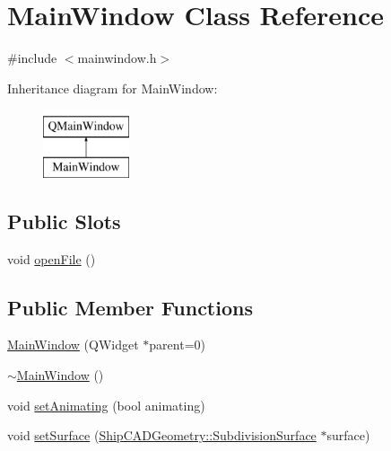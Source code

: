 \hypertarget{classMainWindow}{\section{Main\-Window Class Reference}
\label{classMainWindow}
}


{\ttfamily \#include $<$mainwindow.\-h$>$}

Inheritance diagram for Main\-Window\-:\begin{figure}[H]
\begin{center}
\leavevmode
\includegraphics[height=2.000000cm]{classMainWindow}
\end{center}
\end{figure}
\subsection*{Public Slots}
\begin{DoxyCompactItemize}
\item 
void \hyperlink{classMainWindow_a288b768c3c21a9171bdc56fe845ece8b}{open\-File} ()
\end{DoxyCompactItemize}
\subsection*{Public Member Functions}
\begin{DoxyCompactItemize}
\item 
\hyperlink{classMainWindow_a8b244be8b7b7db1b08de2a2acb9409db}{Main\-Window} (Q\-Widget $\ast$parent=0)
\item 
\hyperlink{classMainWindow_ae98d00a93bc118200eeef9f9bba1dba7}{$\sim$\-Main\-Window} ()
\item 
void \hyperlink{classMainWindow_ae53d70703200d86162a68a9a8ba593ee}{set\-Animating} (bool animating)
\item 
void \hyperlink{classMainWindow_a46174915909fa9012d8cb99e37a85fbc}{set\-Surface} (\hyperlink{classShipCADGeometry_1_1SubdivisionSurface}{Ship\-C\-A\-D\-Geometry\-::\-Subdivision\-Surface} $\ast$surface)
\end{DoxyCompactItemize}
